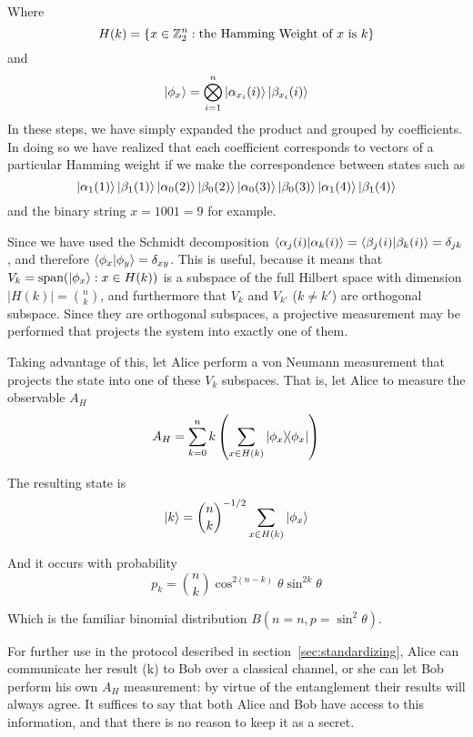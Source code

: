 Where 
$$
H(k) = \left\{ 
x \in \mathbb{Z}_2^n : \text{the Hamming Weight of $x$ is $k$} 
\right\}
$$
and
$$
\ket{\phi_x} = \bigotimes_{i=1}^n 
\ket{\alpha_{x_i}(i)} \ket{\beta_{x_i}(i)}
$$
In these steps, we have simply expanded the product and grouped by coefficients. In doing so we have realized that each coefficient corresponds to vectors of a particular Hamming weight if we make the correspondence between states such as
$$\ket{\alpha_1(1)} \ket{\beta_1(1)} \ket{\alpha_0(2)} \ket{\beta_0(2)} \ket{\alpha_0(3)} \ket{\beta_0(3)} \ket{\alpha_1(4)} \ket{\beta_1(4)}$$
and the binary string $x = 1001 = 9$ for example.

Since we have used the Schmidt decomposition $ \braket{\alpha_j(i)}{\alpha_k(i)} = \braket{\beta_j(i)}{\beta_k(i)} = \delta_{jk} $, and therefore $\braket{\phi_x}{\phi_y} = \delta_{xy}$.
This is useful, because it means that $V_k = \text{span}(\ket{\phi_x} : x \in H(k))$ is a subspace of the full Hilbert space with dimension $|H(k)| = \binom{n}{k}$, and furthermore that $V_k$ and $V_{k'}$ ($k\neq k'$) are orthogonal subspace.
Since they are orthogonal subspaces, a projective measurement may be performed that projects the system into exactly one of them.

Taking advantage of this, let Alice perform a von Neumann measurement that projects the state into one of these $V_k$ subspaces. That is, let Alice to measure the observable $A_H$
$$
A_H = \sum_{k=0}^n k \left( \sum_{x \in H(k)}  \dyad{\phi_x}{\phi_x} \right) 
$$

The resulting state is
\begin{equation}
\label{eqn:kstate}
\ket{k} = \binom{n}{k}^{-1/2} \sum_{x \in H(k)} \ket{\phi_x}
\end{equation}

And it occurs with probability
\begin{equation}
\label{eqn:pk}
p_k = \binom{n}{k} \cos^{2(n-k)}\theta \sin^{2k}\theta
\end{equation}

Which is the familiar binomial distribution $B(n=n, p=\sin^2\theta)$.

For further use in the protocol described in section~\ref{sec:standardizing}, Alice can communicate her result (k) to Bob over a classical channel, or she can let Bob perform his own $A_H$ measurement: by virtue of the entanglement their results will always agree. It suffices to say that both Alice and Bob have access to this information, and that there is no reason to keep it as a secret.

